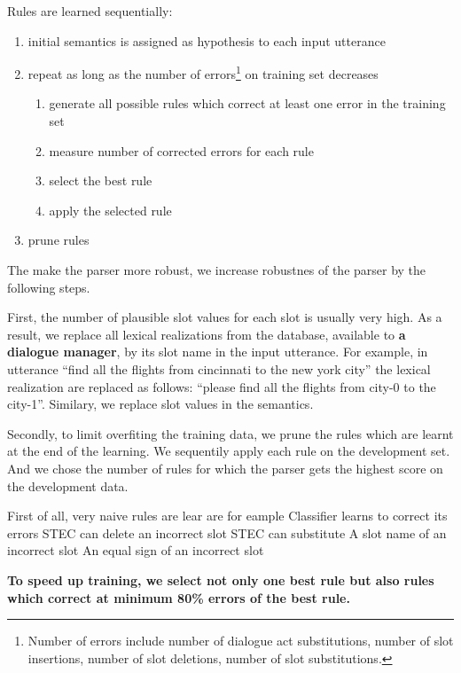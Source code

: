 \documentclass[11pt]{article}
\begin{document}
Rules are learned sequentially:
\begin{enumerate}
  \item initial semantics is assigned as hypothesis to each input utterance
  \item repeat as long as the number of errors\footnote{Number of errors include number of dialogue act substitutions, number of slot insertions, number of slot deletions, number of slot substitutions.} on training set decreases
  \begin{enumerate}
    \item generate all possible rules which correct at least one error in the training set
    \item measure number of corrected errors for each rule
    \item select the best rule
    \item apply the selected rule
  \end{enumerate}
  \item prune rules
\end{enumerate}

The make the parser more robust, we increase robustnes of the parser by the following steps. 

First, the number of plausible slot values for each slot is usually very high. As a result, we replace all lexical realizations from the database, available to \textbf{a dialogue manager}, by its slot name in the input utterance. For example, in utterance ``find all the flights from cincinnati to the new york city'' the lexical realization are replaced as follows: ``please find all the flights from city-0 to the city-1''. Similary, we replace slot values in the semantics.

Secondly, to limit overfiting the training data, we prune the rules which are learnt at the end of the learning. We sequentily apply each rule on the development set. And we chose the number of rules for which the parser gets the highest score on the development data.



First of all, very naive rules are lear are for eample 
Classifier learns to correct its errors
STEC can delete an incorrect slot
STEC can substitute
A slot name of an incorrect slot
An equal sign of an incorrect slot

\textbf{To speed up training, we select not only one best rule but also rules which correct at minimum 80\% errors of the best rule. }
\end{document}
